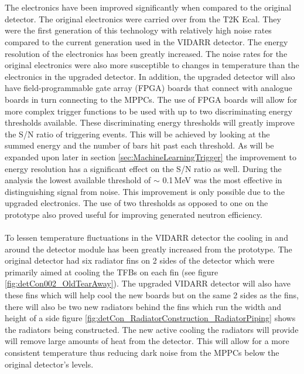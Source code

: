\\\\The electronics have been improved significantly when compared to the original detector. The original electronics were carried over from the T2K Ecal. They were the first generation of this technology with relatively high noise rates compared to the current generation used in the VIDARR detector. The energy resolution of the electronics has been greatly increased. The noise rates for the original electronics were also more susceptible to changes in temperature than the electronics in the upgraded detector. In addition, the upgraded detector will also have field-programmable gate array (FPGA) boards that connect with analogue boards in turn connecting to the MPPCs. The use of FPGA boards will allow for more complex trigger functions to be used with up to two discriminating energy thresholds available. These discriminating energy thresholds will greatly improve the S/N ratio of triggering events. This will be achieved by looking at the summed energy and the number of bars hit past each threshold. As will be expanded upon later in section \ref{sec:MachineLearningTrigger} the improvement to energy resolution has a significant effect on the S/N ratio as well. During the analysis the lowest available threshold of $\sim$ 0.1\,MeV was the most effective in distinguishing signal from noise. This improvement is only possible due to the upgraded electronics. The use of two thresholds as opposed to one on the prototype also proved useful for improving generated neutron efficiency. 
\\\\To lessen temperature fluctuations in the VIDARR detector the cooling in and around the detector module has been greatly increased from the prototype. The original detector had six radiator fins on 2 sides of the detector which were primarily aimed at cooling the TFBs on each fin (see figure \ref{fig:detCon002_OldTearAway}). The upgraded VIDARR detector will also have these fins which will help cool the new boards but on the same 2 sides as the fins, there will also be two new radiators behind the fins which run the width and height of a side figure \ref{fig:detCon_RadiatorConstruction_RadiatorPiping} shows the radiators being constructed. The new active cooling the radiators will provide will remove large amounts of heat from the detector. This will allow for a more consistent temperature  thus reducing dark noise from the MPPCs below the original detector's levels. 

